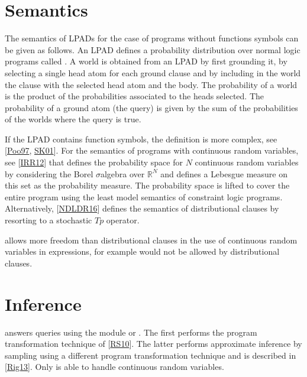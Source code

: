 \documentclass[letterpaper,10pt,english]{sphinxmanual}
\begin{document}
\chapter{Semantics}
\label{\detokenize{index:semantics}}
\sphinxAtStartPar
The semantics of LPADs for the case of programs without functions symbols can be given as follows.
An LPAD defines a probability distribution over normal logic programs called .
A world is obtained from an LPAD by first grounding it, by selecting a single head atom for each ground clause and by including in the world the clause with the selected head atom and the body.
The probability of a world is the product of the probabilities associated to the heads selected.
The probability of a ground atom (the query) is given by the sum of the probabilities of the worlds where the query is true.

\sphinxAtStartPar
If the LPAD contains function symbols, the definition is more complex, see {[}\hyperlink{cite.index:id49}{Poo97}, \hyperlink{cite.index:id50}{SK01}{]}.
For the semantics of programs with continuous random variables, see {[}\hyperlink{cite.index:id51}{IRR12}{]} that defines the probability space for \(N\) continuous random variables by considering the Borel \(\sigma\)\sphinxhyphen{}algebra over \(\mathbb{R}^N\) and defines a Lebesgue measure on this set as the probability measure.
The probability space is lifted to cover the entire program using the least model semantics of constraint logic programs.
Alternatively, {[}\hyperlink{cite.index:id48}{NDLDR16}{]} defines the semantics of distributional clauses by resorting to a stochastic \(Tp\) operator.

\sphinxAtStartPar
{} allows more freedom than distributional clauses in the use of continuous random variables in expressions,
for example  would not be allowed by distributional clauses.


\chapter{Inference}
\label{\detokenize{index:inference}}
\sphinxAtStartPar
{} answers queries using the module  or .
The first performs the program transformation technique of {[}\hyperlink{cite.index:id52}{RS10}{]}.
The latter performs approximate inference by sampling using a different program transformation technique and is described in {[}\hyperlink{cite.index:id53}{Rig13}{]}.
Only  is able to handle continuous random variables.
\end{document}
